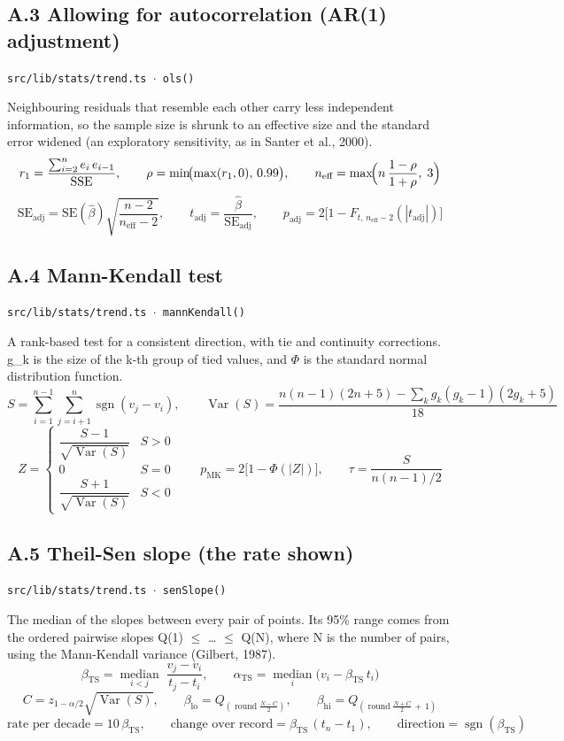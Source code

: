 \documentclass[10pt,a4paper]{article}
\begin{document}
\subsection*{A.3 Allowing for autocorrelation (AR(1) adjustment)}
{\footnotesize\texttt{src/lib/stats/trend.ts $\cdot$ ols()}}

Neighbouring residuals that resemble each other carry less independent information, so the sample size is shrunk to an effective size and the standard error widened (an exploratory sensitivity, as in Santer et al., 2000).
\[
r_1 = \frac{\sum_{i=2}^{n} e_i\, e_{i-1}}{\mathrm{SSE}}, \qquad \rho = \min\!\bigl(\max(r_1, 0),\, 0.99\bigr), \qquad n_{\text{eff}} = \max\!\Bigl(n\,\frac{1-\rho}{1+\rho},\; 3\Bigr)
\]
\[
\mathrm{SE}_{\text{adj}} = \mathrm{SE}(\hat\beta)\sqrt{\frac{n-2}{n_{\text{eff}}-2}}, \qquad t_{\text{adj}} = \frac{\hat\beta}{\mathrm{SE}_{\text{adj}}}, \qquad p_{\text{adj}} = 2\bigl[1 - F_{t,\,n_{\text{eff}}-2}(|t_{\text{adj}}|)\bigr]
\]

\subsection*{A.4 Mann-Kendall test}
{\footnotesize\texttt{src/lib/stats/trend.ts $\cdot$ mannKendall()}}

A rank-based test for a consistent direction, with tie and continuity corrections. g\_k is the size of the k-th group of tied values, and $\Phi$ is the standard normal distribution function.
\[
S = \sum_{i=1}^{n-1}\sum_{j=i+1}^{n} \operatorname{sgn}(v_j - v_i), \qquad \operatorname{Var}(S) = \frac{n(n-1)(2n+5) - \sum_{k} g_k (g_k-1)(2g_k+5)}{18}
\]
\[
Z = \begin{cases} \dfrac{S-1}{\sqrt{\operatorname{Var}(S)}} & S > 0\\[6pt] 0 & S = 0\\[2pt] \dfrac{S+1}{\sqrt{\operatorname{Var}(S)}} & S < 0 \end{cases} \qquad p_{\text{MK}} = 2\bigl[1-\Phi(|Z|)\bigr], \qquad \tau = \frac{S}{n(n-1)/2}
\]

\subsection*{A.5 Theil-Sen slope (the rate shown)}
{\footnotesize\texttt{src/lib/stats/trend.ts $\cdot$ senSlope()}}

The median of the slopes between every pair of points. Its 95\% range comes from the ordered pairwise slopes Q(1) $\le$ \ldots{} $\le$ Q(N), where N is the number of pairs, using the Mann-Kendall variance (Gilbert, 1987).
\[
\beta_{\text{TS}} = \operatorname*{median}_{i<j}\; \frac{v_j - v_i}{t_j - t_i}, \qquad \alpha_{\text{TS}} = \operatorname*{median}_i \bigl(v_i - \beta_{\text{TS}}\, t_i\bigr)
\]
\[
C = z_{1-\alpha/2}\sqrt{\operatorname{Var}(S)}, \qquad \beta_{\text{lo}} = Q_{\left(\operatorname{round}\frac{N-C}{2}\right)}, \qquad \beta_{\text{hi}} = Q_{\left(\operatorname{round}\frac{N+C}{2}\,+\,1\right)}
\]
\[
\text{rate per decade} = 10\,\beta_{\text{TS}}, \qquad \text{change over record} = \beta_{\text{TS}}\,(t_n - t_1), \qquad \text{direction} = \operatorname{sgn}(\beta_{\text{TS}})
\]
\end{document}
